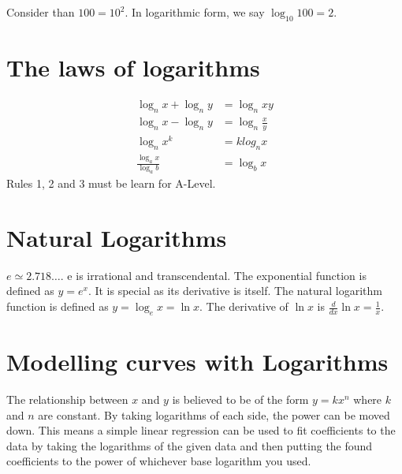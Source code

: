\documentclass[class=article, crop=false]{standalone}
\begin{document}
Consider than $100 = 10^2$. In logarithmic form, we say $\log_{10} 100 = 2$.

\section*{The laws of logarithms}
\begin{align}
\log_n x + \log_n y & = \log_n xy \\
\log_n x - \log_n y & = \log_n \frac{x}{y} \\
\log_n x^k & = k log_n x \\
\frac{\log_a x}{\log_a b} & = \log_b x 
\end{align}
Rules 1, 2 and 3 must be learn for A-Level.

\section*{Natural Logarithms}
$e \simeq 2.718\dots$. e is irrational and transcendental. The exponential function is defined as $y = e^x$. It is special as its derivative is itself. The natural logarithm function is defined as $y = \log_e x = \ln x$. The derivative of $\ln x$ is $\frac{d}{dx} \ln x = \frac{1}{x}$.

\section*{Modelling curves with Logarithms}
The relationship between $x$ and $y$ is believed to be of the form $y = k x^n$ where $k$ and $n$ are constant. By taking logarithms of each side, the power can be moved down. This means a simple linear regression can be used to fit coefficients to the data by taking the logarithms of the given data and then putting the found coefficients to the power of whichever base logarithm you used.
\end{document}
